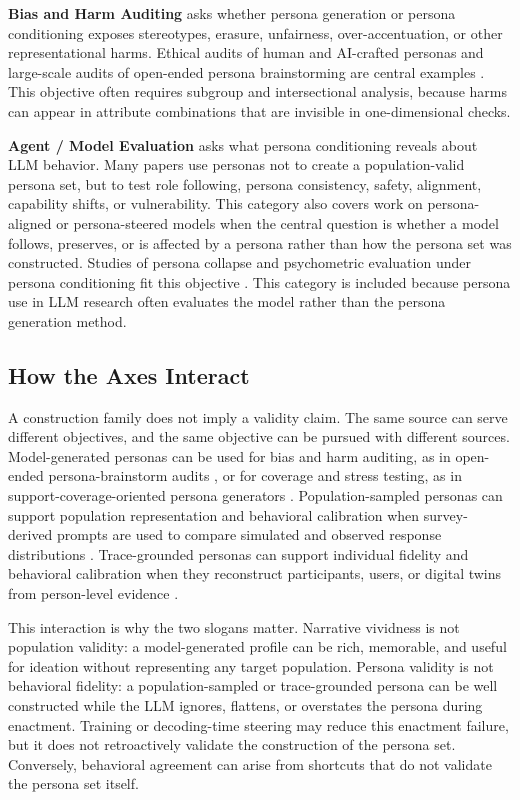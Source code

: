 \textbf{Bias and Harm Auditing} asks whether persona generation or persona
conditioning exposes stereotypes, erasure, unfairness, over-accentuation, or
other representational harms. Ethical audits of human and AI-crafted personas
and large-scale audits of open-ended persona brainstorming are central examples
\citep{arxiv250507850,arxiv260200044}. This objective often requires subgroup
and intersectional analysis, because harms can appear in attribute combinations
that are invisible in one-dimensional checks.

\textbf{Agent / Model Evaluation} asks what persona conditioning reveals about
LLM behavior. Many papers use personas not to create a population-valid persona
set, but to test role following, persona consistency, safety, alignment,
capability shifts, or vulnerability. This category also covers work on
persona-aligned or persona-steered models when the central question is whether a
model follows, preserves, or is affected by a persona rather than how the
persona set was constructed. Studies of persona collapse and
psychometric evaluation under persona conditioning fit this objective
\citep{arxiv260424698,arxiv251022170}. This category is included because
persona use in LLM research often evaluates the model rather than the persona
generation method.

\subsection{How the Axes Interact}

A construction family does not imply a validity claim. The same source can
serve different objectives, and the same objective can be pursued with different
sources. Model-generated personas can be used for bias and harm auditing, as in
open-ended persona-brainstorm audits \citep{arxiv260200044}, or for coverage and
stress testing, as in support-coverage-oriented persona generators
\citep{arxiv260203545}. Population-sampled personas can support population
representation and behavioral calibration when survey-derived prompts are used
to compare simulated and observed response distributions \citep{arxiv251121722}.
Trace-grounded personas can support individual fidelity and behavioral
calibration when they reconstruct participants, users, or digital twins from
person-level evidence \citep{arxiv260107110,arxiv251025536}.

This interaction is why the two slogans matter. Narrative vividness is not
population validity: a model-generated profile can be rich, memorable, and
useful for ideation without representing any target population. Persona validity
is not behavioral fidelity: a population-sampled or trace-grounded persona can
be well constructed while the LLM ignores, flattens, or overstates the persona
during enactment. Training or decoding-time steering may reduce this enactment
failure, but it does not retroactively validate the construction of the persona
set. Conversely, behavioral agreement can arise from shortcuts that do not
validate the persona set itself.

